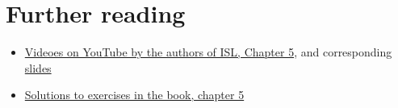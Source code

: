 \documentclass[]{article}
\providecommand{\tightlist}{%
  \setlength{\itemsep}{0pt}\setlength{\parskip}{0pt}}
\begin{document}
\section{Further reading}\label{further-reading}

\begin{itemize}
\tightlist
\item
  \href{https://www.youtube.com/playlist?list=PL5-da3qGB5IA6E6ZNXu7dp89_uv8yocmf}{Videoes
  on YouTube by the authors of ISL, Chapter 5}, and corresponding
  \href{https://lagunita.stanford.edu/c4x/HumanitiesScience/StatLearning/asset/cv_boot.pdf}{slides}
\item
  \href{https://rstudio-pubs-static.s3.amazonaws.com/65561_43c0eaaa8565414eae333b47038f716c.html}{Solutions
  to exercises in the book, chapter 5}
\end{itemize}
\end{document}
